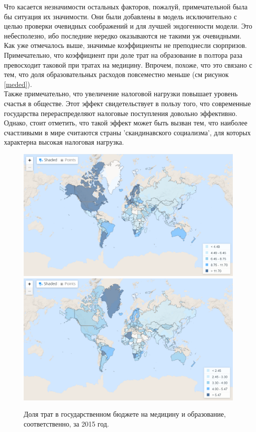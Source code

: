 \documentclass[russian]{vegareport}
\begin{document}
        Что касается незначимости остальных факторов, пожалуй, примечательной была бы ситуация их значимости. Они были добавлены в модель исключительно с целью проверки очевидных соображений и для лучшей эндогенности модели. Это небесполезно, ибо последние нередко оказываются не такими уж очевидными.
        \\
        Как уже отмечалось выше, значимые коэффициенты не преподнесли сюрпризов. Примечательно, что коэффициент при доле трат на образование в полтора раза превосходит таковой при тратах на медицину. Впрочем, похоже, что это связано с тем, что доля образовательных расходов повсеместно меньше (см рисунок \ref{meded}).
        \\
        Также примечательно, что увеличение налоговой нагрузки повышает уровень счастья в обществе. Этот эффект свидетельствует в пользу того, что современные государства перераспределяют налоговые поступления довольно эффективно. Однако, стоит отметить, что такой эффект может быть вызван тем, что наиболее счастливыми в мире считаются страны 'скандинавского социализма', для которых характерна высокая налоговая нагрузка.

        \begin{figure} \label{meded}
            \centering
            \includegraphics[scale=0.5]{Report/meded1.png}
            \includegraphics[scale=0.5]{Report/meded2.png}
            \caption{Доля трат в государственном бюджете на медицину и образование, соответственно, за 2015 год.}
            \label{lect02:pic1}
        \end{figure}
\end{document}
